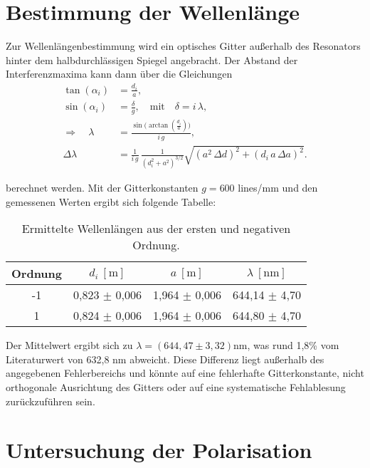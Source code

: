 \chapter{Bestimmung der Wellenlänge}

Zur Wellenlängenbestimmung wird ein optisches Gitter außerhalb des Resonators hinter dem halbdurchlässigen Spiegel angebracht. 
Der Abstand der Interferenzmaxima kann dann über die Gleichungen \cite{Gitterformel}
\begin{align}
\tan(\alpha_i) &= \frac{d_i}{a},\\
\sin(\alpha_i) &= \frac{\delta}{g}, 
\quad\text{mit}\quad \delta = i\,\lambda,\\
\Rightarrow\quad \lambda &= \frac{\sin\bigl(\arctan(\tfrac{d_i}{a})\bigr)}{i\,g},\label{eq:Wellenlänge}\\
\Delta \lambda &= \frac{1}{i\,g}\,\frac{1}{(d_i^2 + a^2)^{3/2}}
\sqrt{(a^2\,\Delta d)^2 + (d_i\,a\,\Delta a)^2}.
\end{align}


berechnet werden.
Mit der Gitterkonstanten $g = 600$ lines/mm und den gemessenen Werten ergibt sich folgende Tabelle:

\begin{table}[htbp]
    \centering
    \begin{tabular}{c|c|c|c}
        Ordnung & \(d_i ~[\text{m}]\) & \(a ~[\text{m}]\) & \(\lambda~[\text{nm}]\)\\
        \hline 
        -1 & 0,823 \(\pm\) 0,006 & 1,964 \(\pm\) 0,006 & 644,14 \(\pm\) 4,70 \\
        1 & 0,824 \(\pm\) 0,006 & 1,964 \(\pm\) 0,006 & 644,80 \(\pm\) 4,70 \\
    \end{tabular}
    \caption{Ermittelte Wellenlängen aus der ersten und negativen Ordnung.}
    \label{tab:Wellenlänge}
\end{table}


Der Mittelwert ergibt sich zu \(\lambda = (644,47 \pm 3,32)\)nm, was rund 1,8\% vom Literaturwert von 632,8 nm abweicht. 
Diese Differenz liegt außerhalb des angegebenen Fehlerbereichs und könnte auf eine fehlerhafte Gitterkonstante, nicht orthogonale Ausrichtung des Gitters oder auf eine systematische Fehlablesung zurückzuführen sein.


\chapter{Untersuchung der Polarisation}

